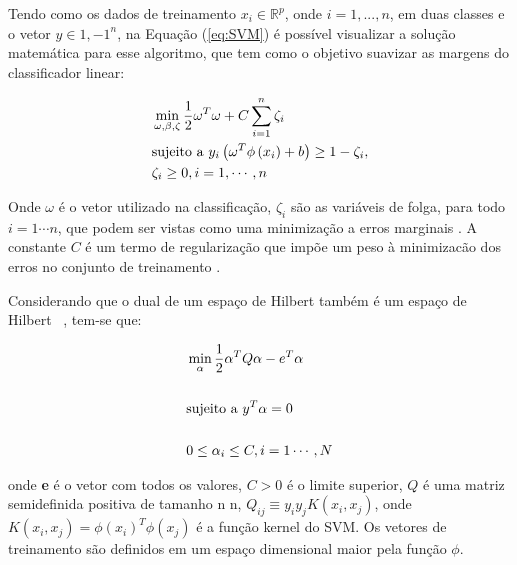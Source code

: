         Tendo como os dados de treinamento $x_{i} \in \mathbb{R}^{p}$, onde $i = 1,...,n$, em duas classes e o vetor $y \in {1,-1}^n$, na Equação (\ref{eq:SVM}) é
        possível visualizar a solução matemática para esse algoritmo, que tem como o objetivo suavizar as margens do classificador linear:

        \begin{equation}\label{eq:SVM}
          \begin{aligned}
            & \min_{\omega,\beta, \zeta } \frac{1}{2}\omega^{T}\omega + C \sum_{i=1}^{n}\zeta_{i}\\
            & \textup{sujeito a } y_{i}\left ( \omega^{T}\phi \left ( x_{i} \right ) +b \right )\geq 1 - \zeta_{i},\\
            & \zeta_{i}\geq 0, i = 1,\cdots, n
        \end{aligned}
        \end{equation}

        Onde $\omega$ é o vetor utilizado na classificação, $\zeta_{i}$ são as variáveis de folga, para todo $i = 1\cdots n$, que podem ser vistas como uma minimização a erros marginais
         \cite{smola2000advances}. A constante $C$ é um termo de regularização que impõe um peso à minimizacão dos erros no conjunto de treinamento \cite{lorena2007introduccao}.

        Considerando que o dual de um espaço de Hilbert também é um espaço de Hilbert ~\cite{lorena2007introduccao}, tem-se que:


        \begin{equation}\label{eq:svmdual}
          \begin{aligned}
            & \min_{\alpha} \frac{1}{2}\alpha^{T}Q\alpha - e^{T}\alpha\\ \\
            & \textup{sujeito a }  y^{T}\alpha = 0 \\ \\
            & 0\leq \alpha_{i}\leq C, i= 1\cdots, N
        \end{aligned}
        \end{equation}

        onde \textbf{e} é o vetor com todos os valores, $C>0$ é o limite superior, $Q$ é uma matriz semidefinida positiva de tamanho n \times n,
        $Q_{ij}\equiv y_{i}y_{j}K(x_{i},x_{j})$, onde $K(x_{i},x_{j}) = \phi(x_{i})^{T}\phi(x_{j})$ é a função kernel do \acrshort{SVM}. Os 
        vetores de treinamento são definidos em um espaço dimensional maior pela função $\phi$.

